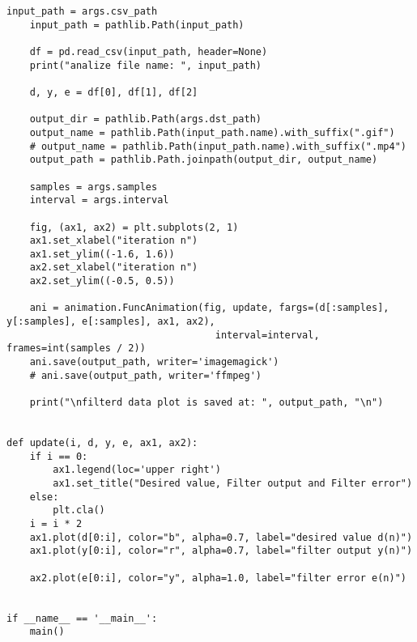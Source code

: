 \begin{lstlisting}[caption=plot\_animation\_from\_csv.py,label=plot\_animation\_from\_csv.py]
    input_path = args.csv_path
    input_path = pathlib.Path(input_path)

    df = pd.read_csv(input_path, header=None)
    print("analize file name: ", input_path)

    d, y, e = df[0], df[1], df[2]

    output_dir = pathlib.Path(args.dst_path)
    output_name = pathlib.Path(input_path.name).with_suffix(".gif")
    # output_name = pathlib.Path(input_path.name).with_suffix(".mp4")
    output_path = pathlib.Path.joinpath(output_dir, output_name)

    samples = args.samples
    interval = args.interval

    fig, (ax1, ax2) = plt.subplots(2, 1)
    ax1.set_xlabel("iteration n")
    ax1.set_ylim((-1.6, 1.6))
    ax2.set_xlabel("iteration n")
    ax2.set_ylim((-0.5, 0.5))

    ani = animation.FuncAnimation(fig, update, fargs=(d[:samples], y[:samples], e[:samples], ax1, ax2),
                                    interval=interval, frames=int(samples / 2))
    ani.save(output_path, writer='imagemagick')
    # ani.save(output_path, writer='ffmpeg')

    print("\nfilterd data plot is saved at: ", output_path, "\n")


def update(i, d, y, e, ax1, ax2):
    if i == 0:
        ax1.legend(loc='upper right')
        ax1.set_title("Desired value, Filter output and Filter error")
    else:
        plt.cla()
    i = i * 2
    ax1.plot(d[0:i], color="b", alpha=0.7, label="desired value d(n)")
    ax1.plot(y[0:i], color="r", alpha=0.7, label="filter output y(n)")

    ax2.plot(e[0:i], color="y", alpha=1.0, label="filter error e(n)")


if __name__ == '__main__':
    main()
\end{lstlisting}

